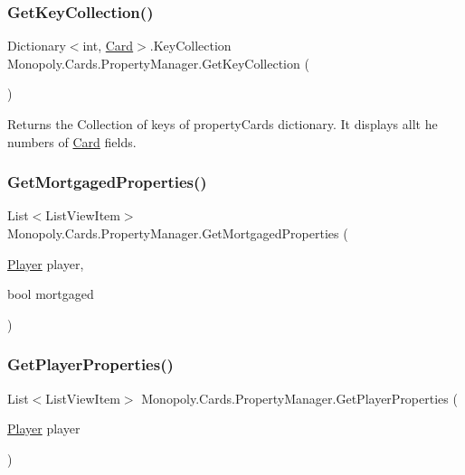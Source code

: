 \subsubsection{\texorpdfstring{Get\+Key\+Collection()}{GetKeyCollection()}}
{\footnotesize\ttfamily Dictionary$<$int, \mbox{\hyperlink{class_monopoly_1_1_cards_1_1_card}{Card}}$>$.Key\+Collection Monopoly.\+Cards.\+Property\+Manager.\+Get\+Key\+Collection (\begin{DoxyParamCaption}{ }\end{DoxyParamCaption})\hspace{0.3cm}{\ttfamily [inline]}}

Returns the Collection of keys of property\+Cards dictionary. It displays allt he numbers of \mbox{\hyperlink{class_monopoly_1_1_cards_1_1_card}{Card}} fields. \mbox{\label{class_monopoly_1_1_cards_1_1_property_manager_a1ccab2c415aac585d65e6e3cae272474}} 
\subsubsection{\texorpdfstring{Get\+Mortgaged\+Properties()}{GetMortgagedProperties()}}
{\footnotesize\ttfamily List$<$List\+View\+Item$>$ Monopoly.\+Cards.\+Property\+Manager.\+Get\+Mortgaged\+Properties (\begin{DoxyParamCaption}\item[{\mbox{\hyperlink{class_monopoly_1_1_players_1_1_player}{Player}}}]{player,  }\item[{bool}]{mortgaged }\end{DoxyParamCaption})\hspace{0.3cm}{\ttfamily [inline]}}

\mbox{\label{class_monopoly_1_1_cards_1_1_property_manager_af1da8a20a41d714ed1eed632c55c26b3}} 
\subsubsection{\texorpdfstring{Get\+Player\+Properties()}{GetPlayerProperties()}}
{\footnotesize\ttfamily List$<$List\+View\+Item$>$ Monopoly.\+Cards.\+Property\+Manager.\+Get\+Player\+Properties (\begin{DoxyParamCaption}\item[{\mbox{\hyperlink{class_monopoly_1_1_players_1_1_player}{Player}}}]{player }\end{DoxyParamCaption})\hspace{0.3cm}{\ttfamily [inline]}}

